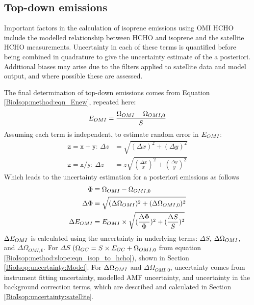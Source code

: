   \subsection{Top-down emissions}
    \label{BioIsop:uncertainty:eomi}
    
    Important factors in the calculation of isoprene emissions using OMI HCHO include the modelled relationship between HCHO and isoprene and the satellite HCHO measurements.
    Uncertainty in each of these terms is quantified before being combined in quadrature to give the uncertainty estimate of the a posteriori.
    Additional biases may arise due to the filters applied to satellite data and model output, and where possible these are assessed. 
    
    The final determination of top-down emissions comes from Equation \ref{BioIsop:method:eqn_Enew}, repeated here: 
    \begin{equation*}
      E_{OMI}=\frac{\Omega_{OMI} - \Omega_{OMI,0}}{S}
    \end{equation*}
    Assuming each term is independent,  to estimate random error in $E_{OMI}$:
    \begin{align}
      \mathtt{z=x+y:} \, \Delta{z} & = \sqrt{(\Delta{x})^2 + (\Delta{y})^2} \label{BioIsop:uncertainty:eqn_quadrature_add} \\
      \mathtt{z=x/y:} \, \Delta{z} & = z \sqrt{(\frac{\Delta{x}}{x})^2 + (\frac{\Delta{y}}{y})^2} \label{BioIsop:uncertainty:eqn_quadrature_divide} 
    \end{align}
    Which leads to the uncertainty estimation for  a posteriori emissions as follows
    \begin{align}
      \Phi & \equiv \Omega_{OMI} - \Omega_{OMI,0}   \notag \\
      \Delta{\Phi} & = \sqrt{(\Delta{\Omega_{OMI}})^2 + (\Delta{\Omega_{OMI,0}})^2}  \label{BioIsop:uncertainty:eomi:eqn_delta_Phi} \\
      \Delta{E_{OMI}} &= E_{OMI} \times \sqrt{(\frac{\Delta{\Phi}}{\Phi})^2 + (\frac{\Delta{S}}{S})^2} \label{BioIsop:uncertainty:eomi:eqn_delta_apost}
    \end{align}
    $\Delta{E_{OMI}}$ is calculated using the uncertainty in underlying terms: $\Delta{S}$, $\Delta{\Omega_{OMI}}$, and $\Delta{\Omega_{OMI,0}}$. 
    For $\Delta{S}$ ($\Omega_{GC} = S \times E_{GC} + \Omega_{OMI,0}$ from equation \ref{BioIsop:method:slope:eqn_isop_to_hcho}), shown in Section \ref{BioIsop:uncertainty:Model}.
    For $\Delta \Omega_{OMI}$ and $\Delta \Omega_{OMI,0}$, uncertainty comes from instrument fitting uncertainty, modelled AMF uncertainty, and uncertainty in the background correction terms, which are described and calculated in Section \ref{BioIsop:uncertainty:satellite}.
    

